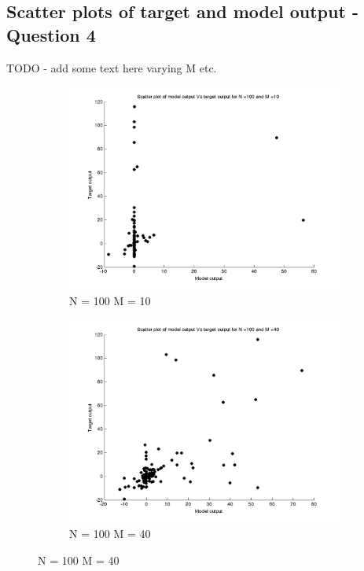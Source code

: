\documentclass{article}
\begin{document}
\subsection{Scatter plots of target and model output - Question 4}

TODO - add some text here varying M etc.

\begin{figure}[H]

\begin{subfigure}{.5\textwidth}
\centering
\includegraphics[width=\linewidth]{D2/Scatter/VaryingM_N100M10}
\caption{N = 100 M = 10}
\end{subfigure}
\begin{subfigure}{.5\textwidth}
\includegraphics[width=\linewidth]{D2/Scatter/VaryingM_N100M40}
\caption{N = 100 M = 40}
\end{subfigure}



\end{figure}
\end{document}
